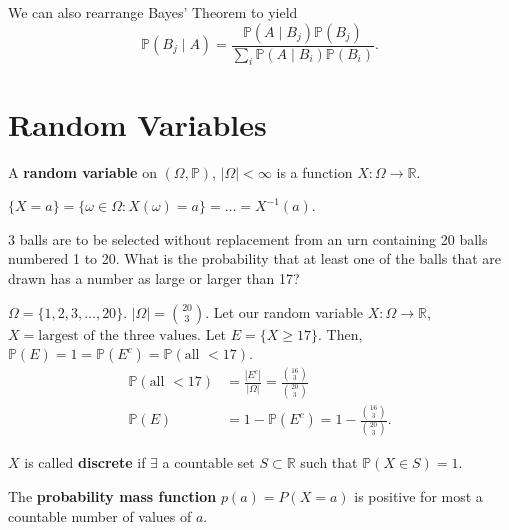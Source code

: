 \begin{theorem}
	We can also rearrange Bayes' Theorem to yield
	\[
		\mathbb{P}(B_j \mid A) = \frac{\mathbb{P}(A \mid  B_j)\mathbb{P}(B_j)}{\sum_i \mathbb{P}(A\mid B_i) \mathbb{P}(B_i)}
	.\] 
\end{theorem}

\section{Random Variables}

\begin{definition}
	A \textbf{random variable} on \( (\Omega, \mathbb{P}) \), \( |\Omega | < \infty \) is a function \( X: \Omega  \to  \mathbb{R} \).
\end{definition}

\begin{notation}
	\( \{X = a\} = \{ \omega  \in \Omega : X(\omega ) = a \} = \ldots = X^{-1}(a) \).
\end{notation}

\begin{eg}
	3 balls are to be selected without replacement from an urn containing 20 balls numbered 1 to 20. What is the probability that at least one of the balls that are drawn has a number as large or larger than 17?
\end{eg}
\begin{explanation}
	\( \Omega =\{1,2,3,\ldots ,20\}   \). \( |\Omega | = \binom{20}{3} \). Let our random variable \( X : \Omega \to \mathbb{R} \), \( X=\text{largest of the three values} \). Let \( E=\{X\ge 17\}   \). Then, \( \mathbb{P}(E)=1 = \mathbb{P}(E^{c}) = \mathbb{P}(\text{all } < 17) \).
	\begin{align*}
		\mathbb{P}(\text{all } < 17) &= \frac{|E^{c}|}{|\Omega |} = \frac{\binom{16}{3}}{\binom{20}{3}} \\
		\mathbb{P}(E) &= 1 - \mathbb{P}(E^{c}) = 1 - \frac{\binom{16}{3}}{\binom{20}{3}}
	.\end{align*}
\end{explanation}

\begin{definition}
	\( X \) is called \textbf{discrete} if \( \exists  \) a countable set \( S \subset \mathbb{R} \) such that \( \mathbb{P}(X \in S) = 1 \).
\end{definition}

\begin{definition}
	The \textbf{probability mass function} \( p(a)=P(X = a) \) is positive for most a countable number of values of \( a \).
\end{definition}

